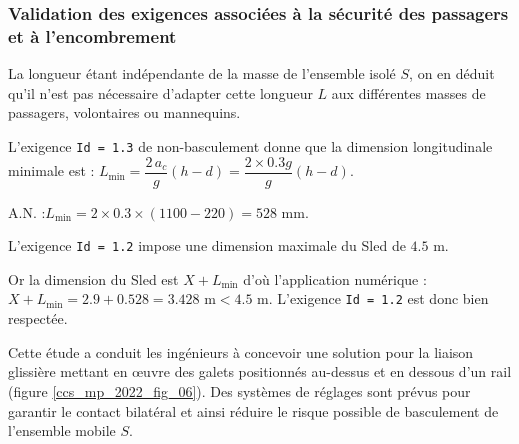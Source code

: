\subsubsection{Validation des exigences associées à la sécurité des passagers et à l'encombrement \label{ccs_mp_2022_sec_2B3}}
\ifprof
\begin{corrige}
La longueur étant indépendante de la masse de l'ensemble isolé $S$, on en déduit qu'il n'est pas nécessaire d'adapter cette longueur $L$ aux différentes masses de passagers, volontaires ou mannequins.
\end{corrige}
\else
\fi


\ifprof
\begin{corrige}
L'exigence \texttt{Id = 1.3} de non-basculement donne que la dimension longitudinale minimale est :
$ L_\text{min} = \dfrac{2\,a_c}{g} (h - d) = \dfrac{2\times 0.3 g}{g} (h - d)$.

A.N. :$ L_\text{min} = 2 \times 0.3 \times (1100 - 220) = 528 \text{ mm}$.
\end{corrige}
\else
\fi


\ifprof
\begin{corrige}
L'exigence \texttt{Id = 1.2} impose une dimension maximale du Sled de $4.5$ m. 

Or la dimension du Sled est $X+L_\text{min}$ d'où l'application numérique :
$ X + L_\text{min} = 2.9 + 0.528 = 3.428 \text{ m} < 4.5 \text{ m}$. 
L'exigence \texttt{Id = 1.2} est donc bien respectée.
\end{corrige}
\else
\fi

\ifprof
\else

\ifprof
\else
Cette étude a conduit les ingénieurs à concevoir une solution pour la liaison glissière mettant en œuvre des galets positionnés au-dessus et en dessous d'un rail (figure \ref{ccs_mp_2022_fig_06}). Des systèmes de réglages sont prévus pour garantir le contact bilatéral et ainsi réduire le risque possible de basculement de l'ensemble mobile $S$.\\
\fi


